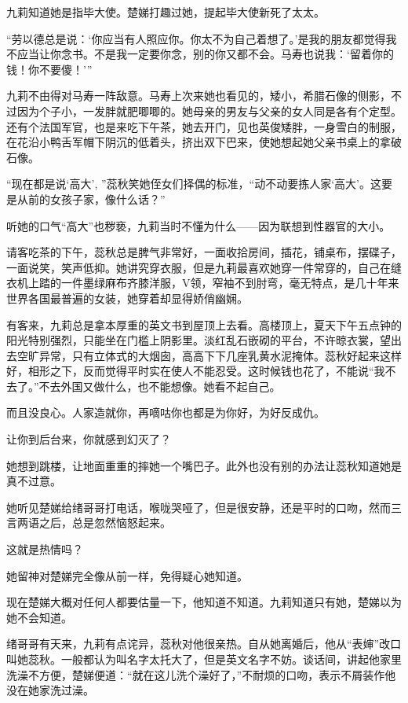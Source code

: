 \par 九莉知道她是指毕大使。楚娣打趣过她，提起毕大使新死了太太。
\par “劳以德总是说：‘你应当有人照应你。你太不为自己着想了。’是我的朋友都觉得我不应当让你念书。不是我一定要你念，别的你又都不会。马寿也说我：‘留着你的钱！你不要傻！'”
\par 九莉不由得对马寿一阵敌意。马寿上次来她也看见的，矮小，希腊石像的侧影，不过因为个子小，一发胖就肥唧唧的。她母亲的男友与父亲的女人同是各有个定型。还有个法国军官，也是来吃下午茶，她去开门，见也英俊矮胖，一身雪白的制服，在花沿小鸭舌军帽下阴沉的低着头，挤出双下巴来，使她想起她父亲书桌上的拿破石像。
\par “现在都是说‘高大’, ”蕊秋笑她侄女们择偶的标准，“动不动要拣人家‘高大’。这要是从前的女孩子家，像什么话？”
\par 听她的口气“高大”也秽亵，九莉当时不懂为什么——因为联想到性器官的大小。
\par 请客吃茶的下午，蕊秋总是脾气非常好，一面收拾房间，插花，铺桌布，摆碟子，一面说笑，笑声低抑。她讲究穿衣服，但是九莉最喜欢她穿一件常穿的，自己在缝衣机上踏的一件墨绿麻布齐膝洋服，V领，窄袖不到肘弯，毫无特点，是几十年来世界各国最普遍的女装，她穿着却显得娇俏幽娴。
\par 有客来，九莉总是拿本厚重的英文书到屋顶上去看。高楼顶上，夏天下午五点钟的阳光特别强烈，只能坐在门槛上阴影里。淡红乱石嵌砌的平台，不许晾衣裳，望出去空旷异常，只有立体式的大烟囱，高高下下几座乳黄水泥掩体。蕊秋好起来这样好，相形之下，反而觉得平时实在使人不能忍受。这时候钱也花了，不能说“我不去了。”不去外国又做什么，也不能想像。她看不起自己。
\par 而且没良心。人家造就你，再嘀咕你也都是为你好，为好反成仇。
\par 让你到后台来，你就感到幻灭了？
\par 她想到跳楼，让地面重重的摔她一个嘴巴子。此外也没有别的办法让蕊秋知道她是真不过意。
\par 她听见楚娣给绪哥哥打电话，喉咙哭哑了，但是很安静，还是平时的口吻，然而三言两语之后，总是忽然恼怒起来。
\par 这就是热情吗？
\par 她留神对楚娣完全像从前一样，免得疑心她知道。
\par 现在楚娣大概对任何人都要估量一下，他知道不知道。九莉知道只有她，楚娣以为她不会知道。
\par 绪哥哥有天来，九莉有点诧异，蕊秋对他很亲热。自从她离婚后，他从“表婶”改口叫她蕊秋。一般都认为叫名字太托大了，但是英文名字不妨。谈话间，讲起他家里洗澡不方便，楚娣便道：“就在这儿洗个澡好了，”不耐烦的口吻，表示不屑装作他没在她家洗过澡。
